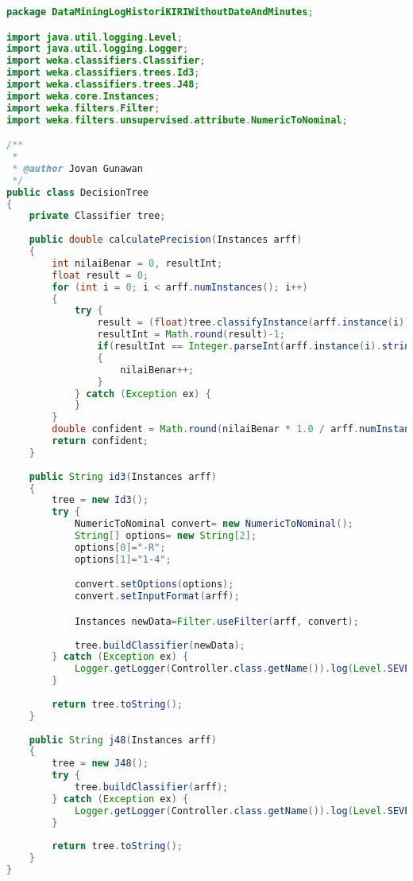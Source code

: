 \begin{lstlisting}[language=Java,basicstyle=\tiny,caption=DecisionTree.java]
package DataMiningLogHistoriKIRIWithoutDateAndMinutes;

import java.util.logging.Level;
import java.util.logging.Logger;
import weka.classifiers.Classifier;
import weka.classifiers.trees.Id3;
import weka.classifiers.trees.J48;
import weka.core.Instances;
import weka.filters.Filter;
import weka.filters.unsupervised.attribute.NumericToNominal;

/**
 *
 * @author Jovan Gunawan
 */
public class DecisionTree 
{
    private Classifier tree;
    
    public double calculatePrecision(Instances arff)
    {
        int nilaiBenar = 0, resultInt;
        float result = 0;
        for (int i = 0; i < arff.numInstances(); i++)
        {    
            try {
                result = (float)tree.classifyInstance(arff.instance(i));
                resultInt = Math.round(result)-1;
                if(resultInt == Integer.parseInt(arff.instance(i).stringValue(4)))
                {
                    nilaiBenar++;
                }
            } catch (Exception ex) {
            }
        }
        double confident = Math.round(nilaiBenar * 1.0 / arff.numInstances() * 10000)/100.0;
        return confident;
    }
    
    public String id3(Instances arff)
    {
        tree = new Id3();
        try {
            NumericToNominal convert= new NumericToNominal();
            String[] options= new String[2];
            options[0]="-R";
            options[1]="1-4"; 

            convert.setOptions(options);
            convert.setInputFormat(arff);

            Instances newData=Filter.useFilter(arff, convert);
            
            tree.buildClassifier(newData);
        } catch (Exception ex) {
            Logger.getLogger(Controller.class.getName()).log(Level.SEVERE, null, ex);
        }
        
        return tree.toString();
    }
    
    public String j48(Instances arff)
    {
        tree = new J48();
        try {
            tree.buildClassifier(arff);
        } catch (Exception ex) {
            Logger.getLogger(Controller.class.getName()).log(Level.SEVERE, null, ex);
        }
        
        return tree.toString();
    }
}
\end{lstlisting}

